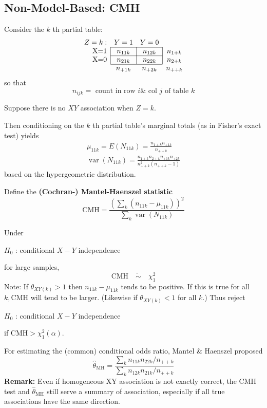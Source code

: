 \documentclass[11pt]{elegantbook}
\begin{document}
\subsection{Non-Model-Based: CMH}
Consider the $k$ th partial table:
$$
\begin{array}{c|c|c|c}
\multicolumn{1}{r}{Z=k:} &\multicolumn{1}{c}{Y=1} &\multicolumn{1}{c}{Y=0}\\
\cline { 2 - 3 }
\multicolumn{1}{r|}{$X=1$} & n_{11k} & n_{12k} & n_{1+k} \\
\cline { 2 - 3 } 
\multicolumn{1}{r|}{$X=0$} & n_{21k} & n_{22k} & n_{2+k} \\
\cline { 2 - 3 } \multicolumn{1}{c}{}&\multicolumn{1}{c}{n_{+1k}}&\multicolumn{1}{c}{n_{+2k}}&\multicolumn{1}{c}{n_{++k}}
\end{array}
$$
so that
$$
n_{i j k}=\text { count in row } i \& \text { col } j \text { of table } k
$$

Suppose there is no $X Y$ association when $Z=k$.

Then conditioning on the $k$ th partial table's marginal totals (as in Fisher's exact test) yields
$$
\begin{gathered}
\mu_{11 k}=E\left(N_{11 k}\right)=\frac{n_{1+k} n_{+1 k}}{n_{++k}} \\
\operatorname{var}\left(N_{11 k}\right)=\frac{n_{1+k} n_{2+k} n_{+1 k} n_{+2 k}}{n_{++k}^2\left(n_{++k}-1\right)}
\end{gathered}
$$
based on the hypergeometric distribution.

\begin{definition}
\normalfont
Define the \textbf{(Cochran-) Mantel-Haenszel statistic}
$$
\mathrm{CMH}=\frac{\left(\sum_k\left(n_{11 k}-\mu_{11 k}\right)\right)^2}{\sum_k \operatorname{var}\left(N_{11 k}\right)}
$$
\end{definition}
Under
\begin{center}
    $H_0$ : conditional $X-Y$ independence
\end{center}
for large samples,
$$
\mathrm{CMH} \quad \dot{\sim} \quad \chi_1^2
$$
Note: If $\theta_{X Y(k)}>1$ then $n_{11 k}-\mu_{11 k}$ tends to be positive. If this is true for all $k, \mathrm{CMH}$ will tend to be larger. (Likewise if $\theta_{X Y(k)}<1$ for all $k$.) Thus reject
\begin{center}
    $H_0$ : conditional $X-Y$ independence
\end{center}
if $\mathrm{CMH}>\chi_1^2(\alpha)$.

For estimating the (common) conditional odds ratio, Mantel \& Haenszel proposed
$$
\hat{\theta}_{\mathrm{MH}}=\frac{\sum_k n_{11 k} n_{22 k} / n_{++k}}{\sum_k n_{12 k} n_{21 k} / n_{++k}}
$$
\textbf{Remark:} Even if homogeneous XY association is not exactly correct, the CMH test and $\hat{\theta}_{\mathrm{MH}}$ still serve a summary of association, especially if all true associations have the same direction.
\end{document}
